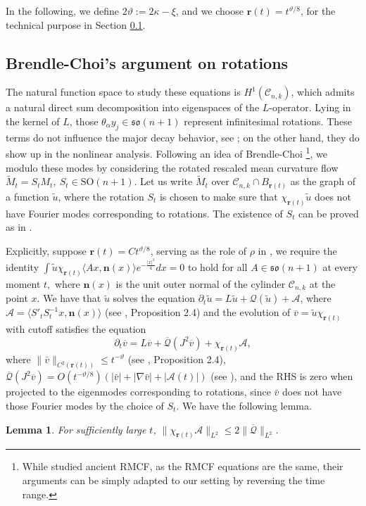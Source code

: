 \documentclass[11pt]{amsart}
\numberwithin{equation}{section}
\newtheorem{lemma}[theorem]{Lemma}
\numberwithin{equation}{section}
\newcommand{\br}{\mathbf{r}}
\newcommand{\cA}{\mathcal{A}}
\newcommand{\cC}{\mathcal{C}}
\newcommand{\cQ}{\mathcal{Q}}
\newcommand{\pr}{\partial}
\begin{document}
	In the following, we define $2\vartheta:=2\kappa-\xi$, and we choose $\br(t)=t^{\vartheta/8}$, for the technical purpose in Section \ref{SS:BC-rotation}.
	
	
	\subsection{Brendle-Choi's argument on rotations}
	\label{SS:BC-rotation}
	The natural function space to study these equations is $H^1(\cC_{n,k})$, which admits a natural direct sum decomposition into eigenspaces of the $L$-operator. Lying in the kernel of $L$, those $\theta_\alpha y_j\in\mathfrak{so}(n+1)$ represent infinitesimal rotations. These terms do not influence the major decay behavior, see \cite{CM2}; on the other hand, they do show up in the nonlinear analysis. Following an idea of Brendle-Choi \cite{BC1, BC2}\footnote{While \cite{BC1, BC2} studied ancient RMCF, as the RMCF equations are the same, their arguments can be simply adapted to our setting by reversing the time range.}, we modulo these modes by considering the rotated rescaled mean curvature flow $\tilde M_t=S_t M_t,\ S_t\in \mathrm{SO}(n+1)$. Let us write $\tilde M_t$ over $\mathcal{C}_{n,k}\cap B_{\br(t)}$ as the graph of a function $\tilde u$, where the rotation $S_t$ is chosen to make sure that $\chi_{\br(t)} \tilde u$ does not have Fourier modes corresponding to rotations. The existence of $S_t$ can be proved as in \cite[Proposition 2.4]{BC2}.
	
	Explicitly, suppose $\br(t)=Ct^{\vartheta/8}$, serving as the role of $\rho$ in \cite[Proposition 2.4]{BC2}, we require the identity $\int \tilde u\chi_{\br(t)} \langle Ax,\mathbf{n}(x)\rangle e^{-\frac{|x|^2}{4}}dx=0$ to hold for all $A\in \mathfrak{so}(n+1)$ at every moment $t,$ where $\mathbf n(x)$ is the unit outer normal of the cylinder $\mathcal C_{n,k}$ at the point $x.$ We have that $\tilde u$ solves the equation $\partial_t \tilde u=L\tilde u+\mathcal Q(\tilde u)+\mathcal A$, where $\mathcal A=\langle S'_t S_t^{-1}x,\mathbf n(x)\rangle$ (see \cite{BC2}, Proposition 2.4) and the evolution of $\overline{v}=\tilde u\chi_{\br(t)}$ with cutoff satisfies the equation
	\begin{equation}\label{eq:bar equation}
		\pr_t \overline{v}=L\overline{v}+\overline{\cQ}(J^2\overline{v})+\chi_{\br(t)}\mathcal A,
	\end{equation}
	where $\|\bar v\|_{C^2(\br(t))}\leq t^{-\vartheta}$ (see \cite{BC2}, Proposition 2.4), $\overline{\cQ}(J^2\overline{v})=O(t^{-\vartheta/8})(|\bar v|+|\nabla \bar v|+|\cA(t)|)$ (see \cite[Lemma 2.4, 2.5]{BC1}), and the RHS is zero when projected to the eigenmodes corresponding to rotations, since $\bar v$ does not have those Fourier modes by the choice of $S_t$. We have the following lemma.
	\begin{lemma}\label{LmA}
		For sufficiently large $t$, $	\|\chi_{\br(t)}\cA\|_{L^2}\leq 2\|\overline{\cQ}\|_{L^2}$.
	\end{lemma}
	
\end{document}
